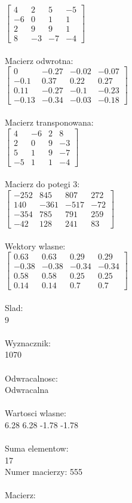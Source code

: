 \documentclass[a4paper,12pt]{article}
\begin{document}
$\begin{bmatrix} 4&2&5&-5\\-6&0&1&1\\2&9&9&1\\8&-3&-7&-4 \end{bmatrix}$
\\
\\
Macierz odwrotna:\\

$\begin{bmatrix} 0&-0.27&-0.02&-0.07\\-0.1&0.37&0.22&0.27\\0.11&-0.27&-0.1&-0.23\\-0.13&-0.34&-0.03&-0.18 \end{bmatrix}$
\\
\\
Macierz transponowana:\\

$\begin{bmatrix} 4&-6&2&8\\2&0&9&-3\\5&1&9&-7\\-5&1&1&-4 \end{bmatrix}$
\\
\\
Macierz do potegi 3:\\

$\begin{bmatrix} -252&845&807&272\\140&-361&-517&-72\\-354&785&791&259\\-42&128&241&83 \end{bmatrix}$
\\
\\
Wektory wlasne:\\

$\begin{bmatrix} 0.63&0.63&0.29&0.29\\-0.38&-0.38&-0.34&-0.34\\0.58&0.58&0.25&0.25\\0.14&0.14&0.7&0.7 \end{bmatrix}$
\\
\\
Slad:\\
9
\\
\\
Wyznacznik:\\
1070
\\
\\
Odwracalnosc:\\
Odwracalna
\\
\\
Wartosci wlasne:\\
6.28 6.28 -1.78 -1.78
\\
\\
Suma elementow:\\
17
\\
\newpage
Numer macierzy:
555
\\
\\
Macierz:\\
\end{document}

